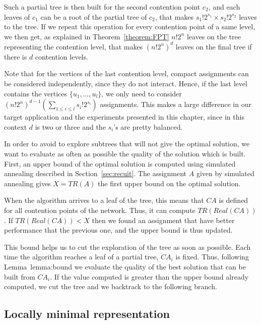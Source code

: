 Such a partial tree is then built for the second contention point $c_2$, and each leaves of $c_1$ can be a root of the partial tree of $c_2$, that makes $s_1!2^{s_1} \times s_2!2^{s_2}$ leaves to the tree. If we repeat this operation for every contention point of a same level, we then get, as explained in Theorem~\ref{theorem:FPT} $n!2^n$ leaves on the tree representing the contention level, that makes $ (n!2^{n})^{d}$ leaves on the final tree if there is $d$ contention levels.

Note that for the vertices of the last contention level, compact assignments can be considered independently, since
they do not interact. Hence, if the last level contains the vertices $\{u_1,\dots,u_l\}$, we only need to consider $(n!2^{n})^{d-1}(\sum_{1 \leq i\leq l} s_{i}!2^{s_i})$ assignments. This makes a large difference in our target application and the experiments presented in this chapter, since in this context $d$ is two or three and the $s_i$'s are pretty balanced.


In order to avoid to explore subtrees that will not give the optimal solution, we want to evaluate as often as possible the quality of the solution which is built. 
First, an upper bound of the optimal solution is computed using simulated annealing described in Section~\ref{sec:recuit}. The assignment $A$ given by simulated annealing gives $X =TR(A)$ the first upper bound on the optimal solution.

When the algorithm arrives to a leaf of the tree, this means that $CA$ is defined for all contention points of the network. Thus, it can compute $TR(Real(CA))$. If $TR(Real(CA)) < X$ then we found an assignment that have better performance that the previous one, and the upper bound is thus updated.

This bound helps us to cut the exploration of the tree as soon as possible. Each time the algorithm reaches a leaf of a partial tree, $CA_i$ is fixed. Thus, following Lemma~{lemma:bound} we evaluate the quality of the best solution that can be built from $CA_i$. If the value computed is greater than the upper bound already computed, we cut the tree and we backtrack to the following branch.







\subsection{Locally minimal representation}

